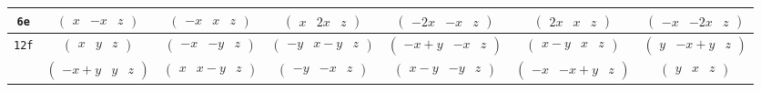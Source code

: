 \documentclass[fleqn,9pt,landscape]{jsarticle}
\begin{document}
\begin{center}
\begin{longtable}{ccccccc}
{\tt 6e} & $ \begin{pmatrix} x & - x & z \end{pmatrix} $ & $ \begin{pmatrix} - x & x & z \end{pmatrix} $ & $ \begin{pmatrix} x & 2 x & z \end{pmatrix} $ & $ \begin{pmatrix} - 2 x & - x & z \end{pmatrix} $ & $ \begin{pmatrix} 2 x & x & z \end{pmatrix} $ & $ \begin{pmatrix} - x & - 2 x & z \end{pmatrix} $ \\ \hline
{\tt 12f} & $ \begin{pmatrix} x & y & z \end{pmatrix} $ & $ \begin{pmatrix} - x & - y & z \end{pmatrix} $ & $ \begin{pmatrix} - y & x - y & z \end{pmatrix} $ & $ \begin{pmatrix} - x + y & - x & z \end{pmatrix} $ & $ \begin{pmatrix} x - y & x & z \end{pmatrix} $ & $ \begin{pmatrix} y & - x + y & z \end{pmatrix} $ \\
& $ \begin{pmatrix} - x + y & y & z \end{pmatrix} $ & $ \begin{pmatrix} x & x - y & z \end{pmatrix} $ & $ \begin{pmatrix} - y & - x & z \end{pmatrix} $ & $ \begin{pmatrix} x - y & - y & z \end{pmatrix} $ & $ \begin{pmatrix} - x & - x + y & z \end{pmatrix} $ & $ \begin{pmatrix} y & x & z \end{pmatrix} $ \\
\end{longtable}
\end{center}
\end{document}
